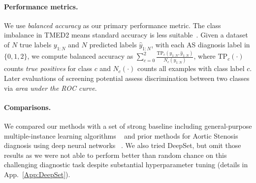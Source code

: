 \paragraph{Performance metrics.}
We use \emph{balanced accuracy} 
as our primary performance metric.
The class imbalance in TMED2 means standard accuracy is less suitable~\citep{huang2021new}.  
Given a dataset of $N$ true labels $y_{1:N}$ and $N$ predicted labels $\hat{y}_{1:N}$, with each AS diagnosis label in $\{0, 1, 2\}$, we compute balanced accuracy as $\sum_{c=0}^{2} \frac{\text{TP}_{c}(y_{1:N}, \hat{y}_{1:N})}{N_{c}(y_{1:N})}$, where $\text{TP}_c(\cdot)$ counts \emph{true positives} for class $c$ and $N_c(\cdot)$ counts all examples with class label $c$.
Later evaluations of screening potential assess discrimination between two classes via \emph{area under the ROC curve}.




\paragraph{Comparisons.}
We compared our methods with a set of strong baseline including general-purpose multiple-instance learning algorithms ~\citep{zaheer2017deep, ilse2018attention, lee2019set, li2021dual} and prior methods for Aortic Stenosis diagnosis using deep neural networks ~\citep{wessler2023automated, holste2022automated, holste2022self}. %
We also tried DeepSet, but omit those results as we were not able to perform better than random chance on this challenging diagnostic task despite substantial hyperparameter tuning (details in App.~\ref{App:DeepSet}).


